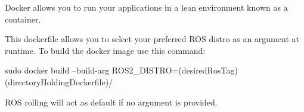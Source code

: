 Docker allows you to run your applications in a lean environment known as a container.

This dockerfile allows you to select your preferred ROS distro as an argument at runtime. To build the docker image use this command\+:

\begin{DoxyVerb}sudo docker build --build-arg ROS2_DISTRO=(desiredRosTag) (directoryHoldingDockerfile)/
\end{DoxyVerb}


ROS rolling will act as default if no argument is provided. 